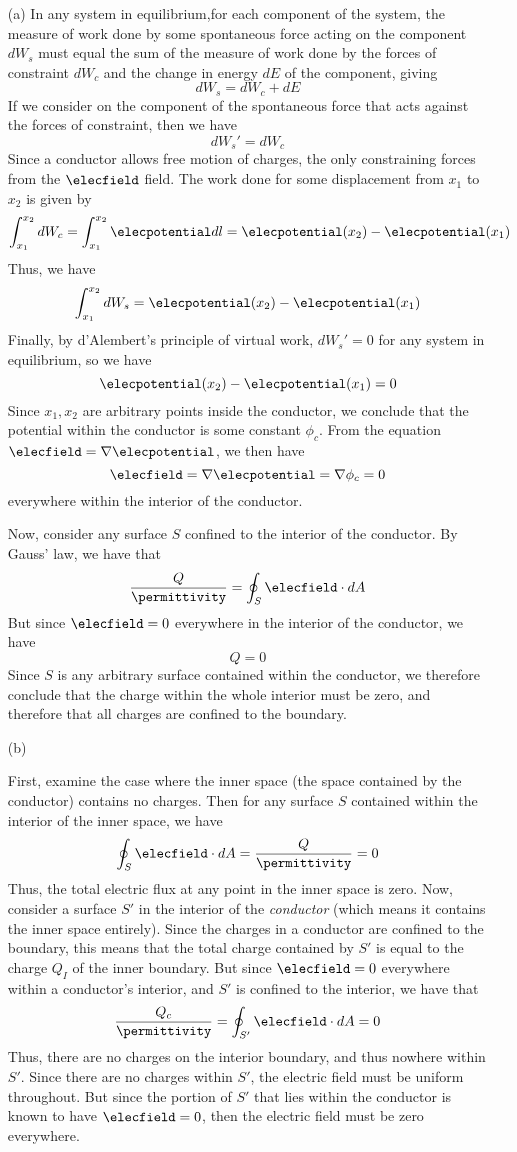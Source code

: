 \begin{itemize}
\item[(a)] In any system in equilibrium,for each component of the system,
  the measure of work done by some spontaneous force acting on the
  component $dW_s$ must equal the sum of the measure of work done by
  the forces of constraint $dW_c$ and the change in energy $dE$ of the
  component, giving
  \[
  dW_s = dW_c + dE
  \]
  If we consider on the component of the spontaneous force that acts
  against the forces of constraint, then we have
  \[
  dW_s' = dW_c
  \]
  Since a conductor allows free motion of charges, the only
  constraining forces from the $\elecfield$ field.  The work done
  for some displacement from $x_1$ to $x_2$ is given by
  \[
  \int_{x_1}^{x_2} dW_c
  =
  \int_{x_1}^{x_2} \elecpotential dl
  =
  \elecpotential(x_2) - \elecpotential(x_1)
  \]
  Thus, we have
  \[
  \int_{x_1}^{x_2} dW_s = \elecpotential(x_2) - \elecpotential(x_1)
  \]
  Finally, by d'Alembert's principle of virtual work, $dW_s' = 0$ for any
  system in equilibrium, so we have
  \[
  \elecpotential(x_2) - \elecpotential(x_1) = 0
  \]
  Since $x_1,x_2$ are arbitrary points inside the conductor, we
  conclude that the potential within the conductor is some constant
  $\phi_c$.  From the equation $\elecfield = \nabla\elecpotential$, we
  then have
  \[
  \elecfield = \nabla\elecpotential = \nabla\phi_c = 0
  \]
  everywhere within the interior of the conductor.

  Now, consider any surface $S$ confined to the interior of the
  conductor.  By Gauss' law, we have that
  \[
  \frac{Q}{\permittivity} = \oint_S \elecfield \cdot dA
  \]
  But since $\elecfield = 0$ everywhere in the interior of the
  conductor, we have
  \[
  Q = 0
  \]
  Since $S$ is any arbitrary surface contained within the conductor,
  we therefore conclude that the charge within the whole interior must
  be zero, and therefore that all charges are confined to the boundary.


\item[(b)]

  First, examine the case where the inner space (the space contained
  by the conductor) contains no charges.  Then for any surface $S$
  contained within the interior of the inner space, we have
  \[
  \oint_S \elecfield \cdot dA = \frac{Q}{\permittivity} = 0
  \]
  Thus, the total electric flux at any point in the inner space is
  zero.  Now, consider a surface $S'$ in the interior of the
  \emph{conductor} (which means it contains the inner space entirely).
  Since the charges in a conductor are confined to the boundary, this
  means that the total charge contained by $S'$ is equal to the charge
  $Q_I$ of the inner boundary.  But since $\elecfield = 0$ everywhere
  within a conductor's interior, and $S'$ is confined to the interior,
  we have that
  \[
  \frac{Q_c}{\permittivity} = \oint_{S'} \elecfield \cdot dA = 0
  \]
  Thus, there are no charges on the interior boundary, and thus
  nowhere within $S'$.  Since there are no charges within $S'$, the
  electric field must be uniform throughout.  But since the portion of
  $S'$ that lies within the conductor is known to have $\elecfield =
  0$, then the electric field must be zero everywhere.


\end{itemize}
